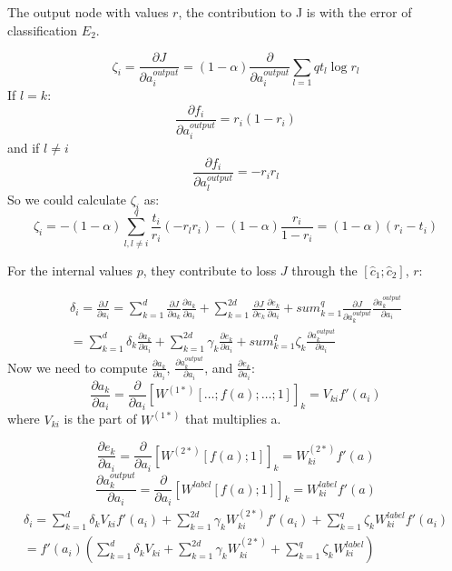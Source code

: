 \documentclass[twoside,12pt]{article}
\begin{document}
The output node with values $r$, the contribution to J is with the error of classification $E_2$.

\begin{equation}
\zeta_i=\frac{\partial J}{\partial a^{output}_i}=(1-\alpha)\frac{\partial }{\partial a^{output}_i}\sum_{l=1}{q}t_l\log{r_l}
\end{equation}
If $l=k$:
\begin{equation}
\frac{\partial f_i}{\partial a^{output}_{i}}=r_i(1-r_i)
\end{equation}
and if $l\neq i$
\begin{equation}
\frac{\partial f_i}{\partial a^{output}_{l}}=-r_ir_l
\end{equation}
So we could calculate $\zeta_i$ as:
\begin{equation}
\zeta_i = -(1-\alpha)\sum_{l,l\neq i}^q\frac{t_i}{r_i}(-r_lr_i)-(1-\alpha)\frac{r_i}{1-r_i}=(1-\alpha)(r_i-t_i)
\end{equation}

For the internal values $p$, they contribute to loss $J$ through the $[\hat{c}_1;\hat{c}_2]$, $r$:

\begin{align}
\delta_i=\frac{\partial J}{\partial a_i}=\sum_{k=1}^{d}\frac{\partial J}{\partial a_k}\frac{\partial a_k}{\partial a_i}+\sum_{k=1}^{2d}\frac{\partial J}{\partial e_k}\frac{\partial e_k}{\partial a_i}+sum_{k=1}^{q}\frac{\partial J}{\partial a^{output}_k}\frac{\partial a^{output}_k}{\partial a_i} \\
= \sum_{k=1}^{d}\delta_k\frac{\partial a_k}{\partial a_i}+\sum_{k=1}^{2d}\gamma_k\frac{\partial e_k}{\partial a_i}+sum_{k=1}^{q}\zeta_k\frac{\partial a^{output}_k}{\partial a_i}
\end{align}
Now we need to compute $\frac{\partial a_k}{\partial a_i}$, $\frac{\partial a^{output}_k}{\partial a_i}$, and $\frac{\partial e_k}{\partial a_i}$:
\begin{equation}
\frac{\partial a_k}{\partial a_i}=\frac{\partial}{\partial a_i}[W^{(1*)}[\ldots;f(a);\ldots;1]]_k=V_{ki}f'(a_i)
\end{equation}
where $V_{ki}$ is the part of $W^{(1*)}$ that multiplies a.

\begin{equation}
\frac{\partial e_k}{\partial a_i}=\frac{\partial}{\partial a_i}[W^{(2*)}[f(a);1]]_k = W^{(2*)}_{ki}f'(a)
\end{equation}
\begin{equation}
\frac{\partial a^{output}_k}{\partial a_i}=\frac{\partial }{\partial a_i}[W^{label}[f(a);1]]_k=W^{label}_{ki}f'(a)
\end{equation}
\begin{align}
\delta_i=\sum_{k=1}^{d}\delta_kV_{ki}f'(a_i)+\sum_{k=1}^{2d}\gamma_kW^{(2*)}_{ki}f'(a_i)+\sum_{k=1}^q \zeta_k W^{label}_{ki}f'(a_i)\\
=f'(a_i)(\sum_{k=1}^{d}\delta_kV_{ki}+\sum_{k=1}^{2d}\gamma_kW^{(2*)}_{ki}+\sum_{k=1}^q \zeta_k W^{label}_{ki})
\end{align}
\end{document}
